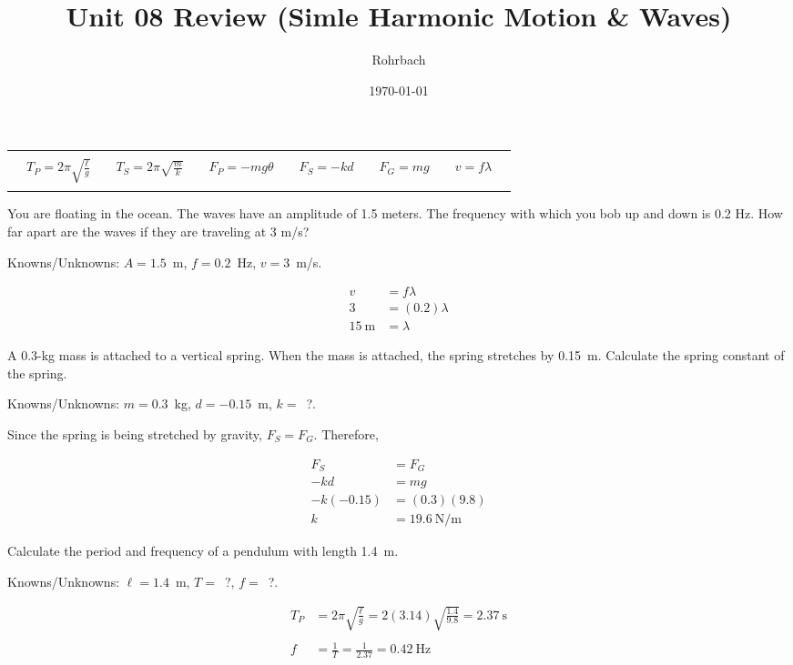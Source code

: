 \documentclass[10pt]{exam}
\title{Unit 08 Review (Simle Harmonic Motion \& Waves)}
\author{Rohrbach}
\date{\today}
\newcommand{\printeqs}{
  \ifprintanswers
  \else
    \begin{center}
      \begin{tabular}{|*{13}{c}|}
        \hline 
        &&&&&&&&&&&&\\
        &
        $T_P=2\pi\sqrt{\frac{\ell}{g}}$ &&
        $T_S=2\pi\sqrt{\frac{m}{k}}$ &&
        $F_P=-mg\theta$ &&
        $F_S=-kd$ &&
        $F_G=mg$ &&
        $v=f\lambda$&\\
        &&&&&&&&&&&&\\
        \hline
      \end{tabular}
    \end{center}
  \fi
}
\begin{document}
\maketitle

\printeqs

\begin{questions}

\question 
  You are floating in the ocean.  The waves have an amplitude of 1.5 meters.  The frequency with which you bob up and down is 0.2 Hz.  How far apart are the waves if they are traveling at 3 m/s?
  
  \begin{solution}[\stretch{1}]
    Knowns/Unknowns: $A=1.5$~m, $f=0.2$~Hz, $v=3$~m/s.

    \begin{align*}
      v &= f\lambda \\
      3 &= (0.2)\lambda \\
      \SI{15}{\meter} &= \lambda
    \end{align*}

  \end{solution}

\question
  A 0.3-kg mass is attached to a vertical spring. When the mass is attached, the spring stretches by 0.15~m. Calculate the spring constant of the spring.

  \begin{solution}[\stretch{1}]
    Knowns/Unknowns: $m=0.3$~kg, $d=-0.15$~m, $k=$~?.

    Since the spring is being stretched by gravity, $F_S=F_G$.  Therefore,

    \begin{align*}
      F_S &= F_G \\
      -kd &= mg  \\
      -k(-0.15) &= (0.3)(9.8) \\
      k &= \SI{19.6}{\newton\per\meter}
    \end{align*}

  \end{solution}

\question
  Calculate the period and frequency of a pendulum with length 1.4~m.

  \begin{solution}[\stretch{1}]
    Knowns/Unknowns: $\ell=1.4$~m, $T=$~?, $f=$~?.

    \begin{align*}
      T_P &= 2\pi \sqrt{\frac{\ell}{g}} 
            = 2(3.14) \sqrt{\frac{1.4}{9.8}} 
            = \SI{2.37}{\second} \\\\
      f   &= \frac{1}{T} = \frac{1}{2.37} = \SI{0.42}{\hertz}
    \end{align*}


\end{solution}
\end{questions}
\end{document}
